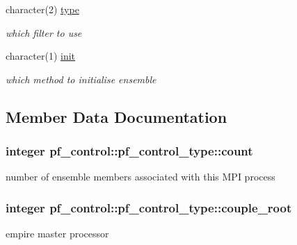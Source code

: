 \begin{DoxyCompactItemize}
character(2) \hyperlink{structpf__control_1_1pf__control__type_ab21afb0aa9c7933073356dbc2155870c}{type}
\begin{DoxyCompactList}\small\item\em which filter to use \end{DoxyCompactList}\item 
character(1) \hyperlink{structpf__control_1_1pf__control__type_ab024d9ea51de1956c671b483f1c9d020}{init}
\begin{DoxyCompactList}\small\item\em which method to initialise ensemble \end{DoxyCompactList}\end{DoxyCompactItemize}


\subsection{Member Data Documentation}
\hypertarget{structpf__control_1_1pf__control__type_a8e26d20b11d6b909dc10731cd3e8d42f}{
\subsubsection[{count}]{\setlength{\rightskip}{0pt plus 5cm}integer pf\-\_\-control\-::pf\-\_\-control\-\_\-type\-::count}}\label{structpf__control_1_1pf__control__type_a8e26d20b11d6b909dc10731cd3e8d42f}


number of ensemble members associated with this M\-P\-I process 

\hypertarget{structpf__control_1_1pf__control__type_a739b1b0b9ed322b84b834b9a185fe238}{
\subsubsection[{couple\-\_\-root}]{\setlength{\rightskip}{0pt plus 5cm}integer pf\-\_\-control\-::pf\-\_\-control\-\_\-type\-::couple\-\_\-root}}\label{structpf__control_1_1pf__control__type_a739b1b0b9ed322b84b834b9a185fe238}


empire master processor 

